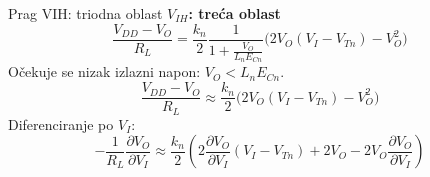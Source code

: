 \begin{frame}[label=09_1-s020]{Prag VIH: triodna oblast}\setlength{\parskip}{2pt}\setlength{\abovedisplayskip}{4pt}\setlength{\belowdisplayskip}{4pt}\setlength{\abovedisplayshortskip}{3pt}\setlength{\belowdisplayshortskip}{3pt}
\textbf{$V_{IH}$: treća oblast}\[\frac{V_{DD}-V_O}{R_L}=\frac{k_n}{2}\frac1{1+\frac{V_O}{L_nE_{Cn}}}\bigl(2V_O(V_I-V_{Tn})-V_O^2\bigr)\]
Očekuje se nizak izlazni napon: $V_O<L_nE_{Cn}$.\[\frac{V_{DD}-V_O}{R_L}\approx\frac{k_n}{2}\bigl(2V_O(V_I-V_{Tn})-V_O^2\bigr)\]
Diferenciranje po $V_I$:\[-\frac1{R_L}\frac{\partial V_O}{\partial V_I}\approx\frac{k_n}{2}\left(2\frac{\partial V_O}{\partial V_I}(V_I-V_{Tn})+2V_O-2V_O\frac{\partial V_O}{\partial V_I}\right)\]

\end{frame}
